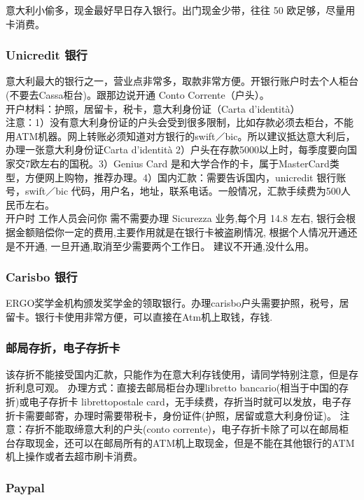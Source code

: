 意大利小偷多，现金最好早日存入银行。出门现金少带，往往 50 欧足够，尽量用卡消费。

\subsubsection{Unicredit 银行}

意大利最大的银行之一，营业点非常多，取款非常方便。开银行账户时去个人柜台(不要去Cassa柜台)。跟那边说开通 Conto Corrente（户头）。\\
开户材料：护照，居留卡，税卡，意大利身份证（Carta d’identità）\\
注意：1）没有意大利身份证的户头会受到很多限制，比如存款必须去柜台，不能用ATM机器。网上转账必须知道对方银行的swift／bic。所以建议抵达意大利后，办理一张意大利身份证Carta d’identità 2）户头在存款5000以上时，每季度要向国家交7欧左右的国税。3）Genius Card 是和大学合作的卡，属于MasterCard类型，方便网上购物，推荐办理。4）国内汇款：需要告诉国内，unicredit 银行账号，swift／bic 代码，用户名，地址，联系电话。一般情况，汇款手续费为500人民币左右。\\
开户时 工作人员会问你 需不需要办理 Sicurezza 业务,每个月 14.8 左右, 银行会根据金额赔偿你一定的费用,主要作用就是在银行卡被盗刷情况, 根据个人情况开通还是不开通, 一旦开通,取消至少需要两个工作日。 建议不开通,没什么用。

\subsubsection{Carisbo 银行}
ERGO奖学金机构颁发奖学金的领取银行。办理carisbo户头需要护照，税号，居留卡。银行卡使用非常方便，可以直接在Atm机上取钱，存钱.

\subsubsection{邮局存折，电子存折卡}

该存折不能接受国内汇款，只能作为在意大利存钱使用，请同学特别注意，但是存折利息可观。
办理方式：直接去邮局柜台办理libretto bancario(相当于中国的存折)或电子存折卡 librettopostale card，无手续费，存折当时就可以发放，电子存折卡需要邮寄，办理时需要带税卡，身份证件(护照，居留或意大利身份证)。
注意：存折不能取缔意大利的户头(conto corrente)，电子存折卡除了可以在邮局柜台存取现金，还可以在邮局所有的ATM机上取现金，但是不能在其他银行的ATM机上操作或者去超市刷卡消费。

\subsubsection{Paypal}


